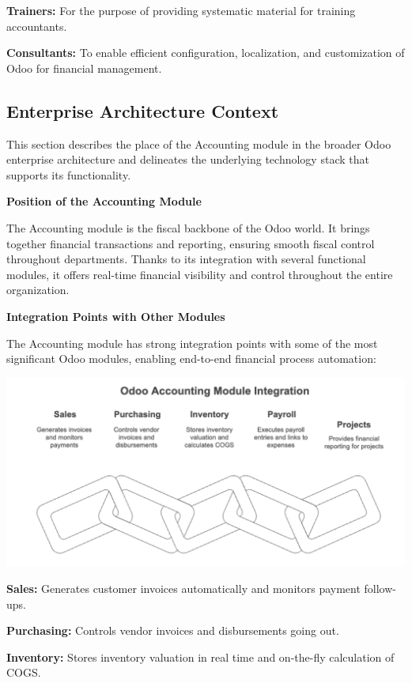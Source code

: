 \documentclass[11pt,a4paper]{article}
\begin{document}
\noindent\textbf{Trainers:} For the purpose of providing systematic material for training accountants.

\noindent\textbf{Consultants:} To enable efficient configuration, localization, and customization of Odoo for financial management.

\subsection{Enterprise Architecture Context}
This section describes the place of the Accounting module in the broader Odoo enterprise architecture and delineates the underlying technology stack that supports its functionality.
\bigskip

\noindent\textbf{Position of the Accounting Module}

\noindent The Accounting module is the fiscal backbone of the Odoo world. It brings together financial transactions and reporting, ensuring smooth fiscal control throughout departments. Thanks to its integration with several functional modules, it offers real-time financial visibility and control throughout the entire organization.
\bigskip

\noindent\textbf{Integration Points with Other Modules}

\noindent The Accounting module has strong integration points with some of the most significant Odoo modules, enabling end-to-end financial process automation:

\begin{center}
    \includegraphics[width=0.8\linewidth]{diagram/odoo_accounting_module_integration.png}
\end{center}

\noindent\textbf{Sales:} Generates customer invoices automatically and monitors payment follow-ups.

\noindent\textbf{Purchasing:} Controls vendor invoices and disbursements going out.

\noindent\textbf{Inventory:} Stores inventory valuation in real time and on-the-fly calculation of COGS.
\end{document}

